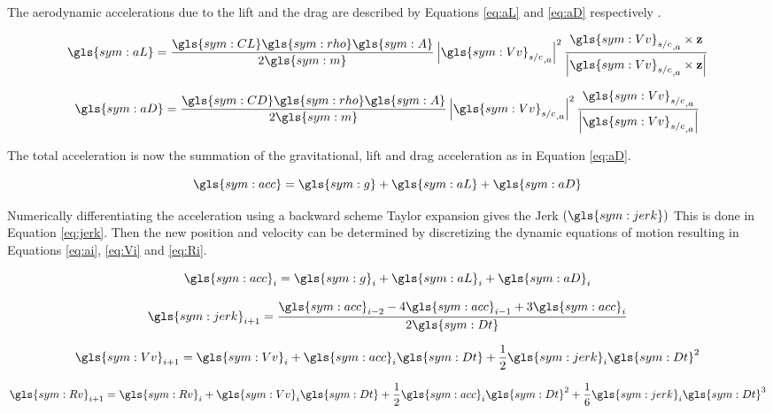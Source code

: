 The aerodynamic accelerations due to the lift and the drag are described by Equations \ref{eq:aL} and \ref{eq:aD} respectively \cite{AndersonJr.2007}.

\begin{equation} \label{eq:aL}
\gls{sym:aL} = \frac{\gls{sym:CL}\gls{sym:rho}\gls{sym:A}}{2 \gls{sym:m}} 
				\left|{\gls{sym:Vv}_{s/c}}_{,a}\right|^2
				\frac{{\gls{sym:Vv}_{s/c}}_{,a} \times \mathbf{z}}
				{\left| {\gls{sym:Vv}_{s/c}}_{,a} \times \mathbf{z}\right|}
\end{equation}

\begin{equation} \label{eq:aD}
\gls{sym:aD} = \frac{\gls{sym:CD}\gls{sym:rho}\gls{sym:A}}{2 \gls{sym:m}}
				\left|{\gls{sym:Vv}_{s/c}}_{,a}\right|^2 \frac{{\gls{sym:Vv}_{s/c}}_{,a}}{\left|{\gls{sym:Vv}_{s/c}}_{,a}\right|}
\end{equation}

The total acceleration is now the summation of the gravitational, lift and drag acceleration as in Equation \ref{eq:aD}.

\begin{equation} \label{eq:acc}
\gls{sym:acc} = \gls{sym:g} + \gls{sym:aL} + \gls{sym:aD}
\end{equation}

Numerically differentiating the acceleration using a backward scheme Taylor expansion gives the Jerk $\left(\gls{sym:jerk}\right)$ This is done in Equation \ref{eq:jerk}. Then the new position and velocity can be determined by discretizing the dynamic equations of motion resulting in Equations \ref{eq:ai}, \ref{eq:Vi} and \ref{eq:Ri}.

\begin{equation} \label{eq:ai}
\gls{sym:acc}_i = \gls{sym:g}_i + \gls{sym:aL}_i + \gls{sym:aD}_i
\end{equation}

\begin{equation} \label{eq:jerk}
\gls{sym:jerk}_{i+1} = \frac{\gls{sym:acc}_{i-2} - 4\gls{sym:acc}_{i-1}+3\gls{sym:acc}_i}{2\gls{sym:Dt}}
\end{equation}

\begin{equation} \label{eq:Vi}
\gls{sym:Vv}_{i+1} = \gls{sym:Vv}_i + \gls{sym:acc}_i \gls{sym:Dt} + \frac{1}{2}\gls{sym:jerk}_i \gls{sym:Dt}^2
\end{equation}

\begin{equation} \label{eq:Ri}
\gls{sym:Rv}_{i+1} = \gls{sym:Rv}_i + \gls{sym:Vv}_i \gls{sym:Dt} + \frac{1}{2}\gls{sym:acc}_i \gls{sym:Dt}^2 + \frac{1}{6}\gls{sym:jerk}_i \gls{sym:Dt}^3
\end{equation}

